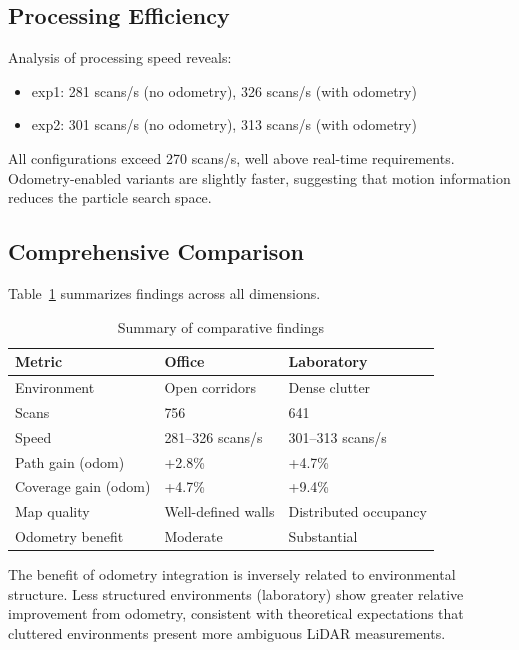 \documentclass[conference]{IEEEtran}
\begin{document}
  \subsection{Processing Efficiency}

  Analysis of processing speed reveals:
  \begin{itemize}
      \item exp1: 281 scans/s (no odometry), 326 scans/s (with odometry)
      \item exp2: 301 scans/s (no odometry), 313 scans/s (with odometry)
  \end{itemize}

  All configurations exceed 270 scans/s, well above real-time requirements. Odometry-enabled variants are
  slightly faster, suggesting that motion information reduces the particle search space.

  \subsection{Comprehensive Comparison}

  Table~\ref{tab:summary} summarizes findings across all dimensions.

  \begin{table}[h]
  \centering
  \caption{Summary of comparative findings}
  \label{tab:summary}
  \small
  \begin{tabular}{@{}lp{3cm}p{3cm}@{}}
  \toprule
  \textbf{Metric} & \textbf{Office} & \textbf{Laboratory} \\
  \midrule
  Environment & Open corridors & Dense clutter \\
  Scans & 756 & 641 \\
  Speed & 281--326 scans/s & 301--313 scans/s \\
  Path gain (odom) & +2.8\% & +4.7\% \\
  Coverage gain (odom) & +4.7\% & +9.4\% \\
  Map quality & Well-defined walls & Distributed occupancy \\
  Odometry benefit & Moderate & Substantial \\
  \bottomrule
  \end{tabular}
  \end{table}

  The benefit of odometry integration is inversely related to environmental structure. Less structured
  environments (laboratory) show greater relative improvement from odometry, consistent with theoretical
  expectations that cluttered environments present more ambiguous LiDAR measurements.
\end{document}
